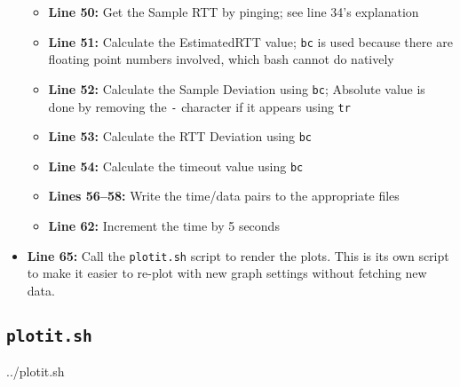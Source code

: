 \documentclass[11pt]{article}
\begin{document}
\begin{itemize}
\begin{itemize}
        \item \textbf{Line 50:} Get the Sample RTT by pinging; see line 34's explanation
        \item \textbf{Line 51:} Calculate the EstimatedRTT value; \texttt{bc} is used because there are 
                floating point numbers involved, which bash cannot do natively
        \item \textbf{Line 52:} Calculate the Sample Deviation using \texttt{bc}; Absolute value is done by removing 
                the \texttt{-} character if it appears using \texttt{tr}
        \item \textbf{Line 53:} Calculate the RTT Deviation using \texttt{bc}
        \item \textbf{Line 54:} Calculate the timeout value using \texttt{bc}
        \item \textbf{Lines 56--58:} Write the time/data pairs to the appropriate files
        \item \textbf{Line 62:} Increment the time by 5 seconds
      \end{itemize}
    \item \textbf{Line 65:} Call the \texttt{plotit.sh} script to render the plots. This is its own script to make it 
          easier to re-plot with new graph settings without fetching new data.
  \end{itemize}

  \subsection{\texttt{plotit.sh}}
  
  {../plotit.sh} %
\end{document}
